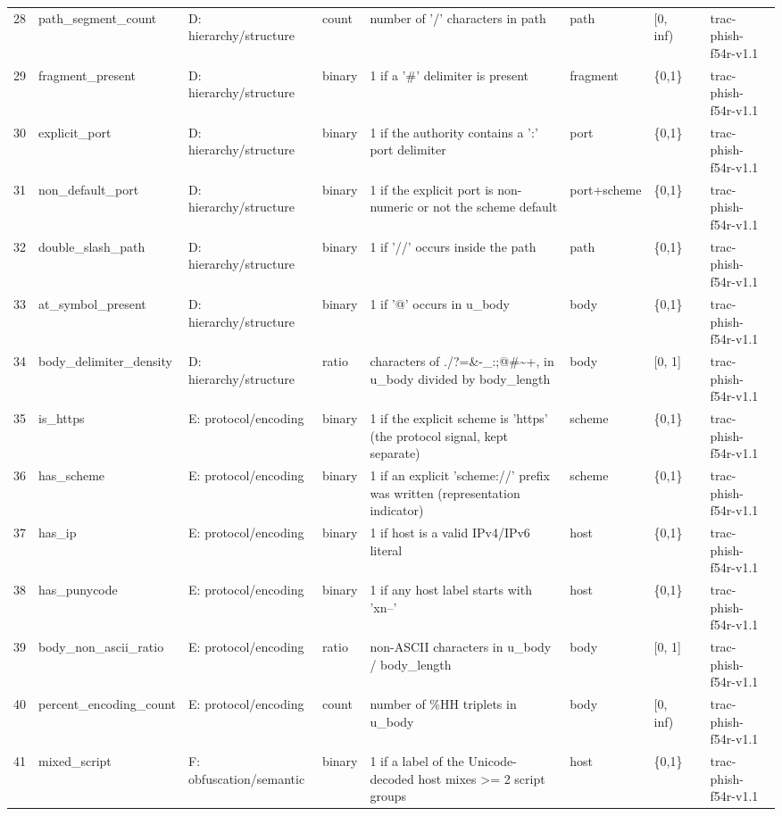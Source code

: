 \begin{tabular}{rllllllll}
28 & path\_segment\_count & D: hierarchy/structure & count & number of '/' characters in path & path & [0, inf) &  & trac-phish-f54r-v1.1 \\
29 & fragment\_present & D: hierarchy/structure & binary & 1 if a '\#' delimiter is present & fragment & \{0,1\} &  & trac-phish-f54r-v1.1 \\
30 & explicit\_port & D: hierarchy/structure & binary & 1 if the authority contains a ':' port delimiter & port & \{0,1\} &  & trac-phish-f54r-v1.1 \\
31 & non\_default\_port & D: hierarchy/structure & binary & 1 if the explicit port is non-numeric or not the scheme default & port+scheme & \{0,1\} &  & trac-phish-f54r-v1.1 \\
32 & double\_slash\_path & D: hierarchy/structure & binary & 1 if '//' occurs inside the path & path & \{0,1\} &  & trac-phish-f54r-v1.1 \\
33 & at\_symbol\_present & D: hierarchy/structure & binary & 1 if '@' occurs in u\_body & body & \{0,1\} &  & trac-phish-f54r-v1.1 \\
34 & body\_delimiter\_density & D: hierarchy/structure & ratio & characters of ./?=\&-\_:;@\#\textasciitilde +, in u\_body divided by body\_length & body & [0, 1] &  & trac-phish-f54r-v1.1 \\
35 & is\_https & E: protocol/encoding & binary & 1 if the explicit scheme is 'https' (the protocol signal, kept separate) & scheme & \{0,1\} &  & trac-phish-f54r-v1.1 \\
36 & has\_scheme & E: protocol/encoding & binary & 1 if an explicit 'scheme://' prefix was written (representation indicator) & scheme & \{0,1\} &  & trac-phish-f54r-v1.1 \\
37 & has\_ip & E: protocol/encoding & binary & 1 if host is a valid IPv4/IPv6 literal & host & \{0,1\} &  & trac-phish-f54r-v1.1 \\
38 & has\_punycode & E: protocol/encoding & binary & 1 if any host label starts with 'xn--' & host & \{0,1\} &  & trac-phish-f54r-v1.1 \\
39 & body\_non\_ascii\_ratio & E: protocol/encoding & ratio & non-ASCII characters in u\_body / body\_length & body & [0, 1] &  & trac-phish-f54r-v1.1 \\
40 & percent\_encoding\_count & E: protocol/encoding & count & number of \%HH triplets in u\_body & body & [0, inf) &  & trac-phish-f54r-v1.1 \\
41 & mixed\_script & F: obfuscation/semantic & binary & 1 if a label of the Unicode-decoded host mixes >= 2 script groups & host & \{0,1\} &  & trac-phish-f54r-v1.1 \\

\end{tabular}
